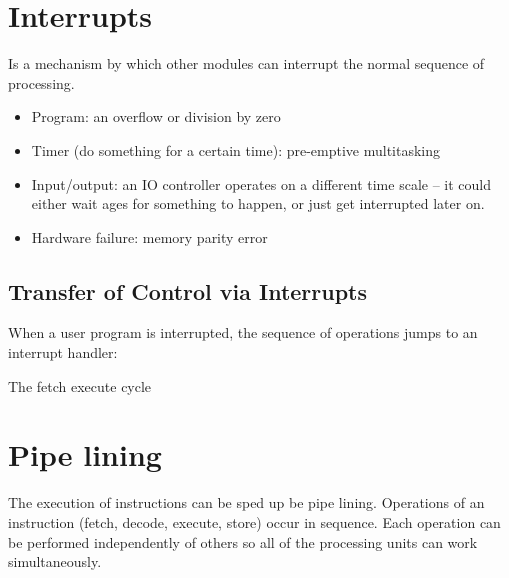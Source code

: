\section{Interrupts}\label{sec:interrupts}

Is a mechanism by which other modules can interrupt the normal sequence of processing.

\begin{itemize}
    \item Program: an overflow or division by zero
    \item Timer (do something for a certain time): pre-emptive multitasking
    \item Input/output: an IO controller operates on a different time scale -- it could either wait ages for something to happen, or just get interrupted later on.
    \item Hardware failure: memory parity error
\end{itemize}

\subsection{Transfer of Control via Interrupts}\label{sub:transfer_of_control_via_interrupts}

When a user program is interrupted, the sequence of operations jumps to an interrupt handler:

\begin{highlight}{The fetch execute cycle}
\end{highlight}

\section{Pipe lining}\label{sec:pipe_lining}

The execution of instructions can be sped up be pipe lining.
Operations of an instruction (fetch, decode, execute, store) occur in sequence.
Each operation can be performed independently of others so all of the processing units can work simultaneously.

